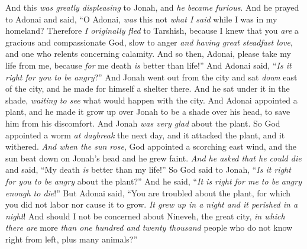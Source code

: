 \begin{biblechapter} %
 And this \textit{was greatly displeasing} to Jonah, and \textit{he became furious}.
\verse And he prayed to Adonai and said, “O Adonai, \textit{was} this not \textit{what I said} while I was in my homeland? Therefore \textit{I originally fled} to Tarshish, because I knew that you \textit{are} a gracious and compassionate God, slow to anger \textit{and having great steadfast love}, and one who relents concerning calamity.
\verse And so then, Adonai, please take my life from me, because \textit{for} me death \textit{is} better than life!”
\verse And Adonai said, “\textit{Is it right for you to be angry}?”
\verse And Jonah went out from the city and sat \textit{down} east of the city, and he made for himself a shelter there. And he sat under it in the shade, \textit{waiting to see} what would happen with the city.
\verse And Adonai appointed a plant, and he made it grow up over Jonah to be a shade over his head, to save him from his discomfort. And Jonah \textit{was very glad} about the plant.
\verse So God appointed a worm \textit{at daybreak} the next day, and it attacked the plant, and it withered.
\verse \textit{And when the sun rose}, God appointed a scorching east wind, and the sun beat down on Jonah’s head and he grew faint. \textit{And he asked that he could die} and said, “My death \textit{is} better than my life!”
\verse So God said to Jonah, “\textit{Is it right for you to be angry} about the plant?” And he said, “\textit{It is right for me to be angry enough to die}!”
\verse But Adonai said, “You are troubled about the plant, for which you did not labor nor cause it to grow. \textit{It grew up in a night and it perished in a night}!
\verse And should I not be concerned about Nineveh, the great city, \textit{in which there are} more \textit{than one hundred and twenty thousand} people who do not know right from left, plus many animals?”
\end{biblechapter}

